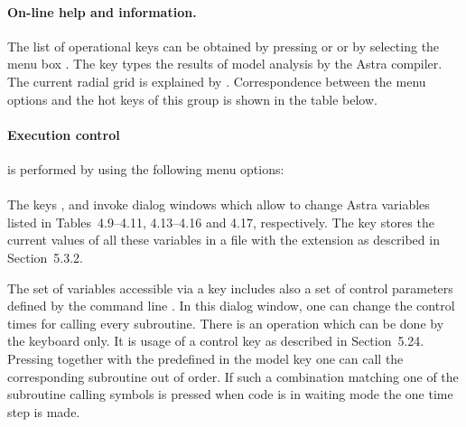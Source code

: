 \paragraph{On-line help and information.}
The list of operational keys can be obtained by pressing  or
 or by selecting the menu box . 
The key  types the results of model analysis by the Astra
compiler. 
The current radial grid is explained by .
Correspondence between the menu options and the hot keys of this group
is shown in the table below.
\bigskip\\ 

\paragraph{Execution control} is performed by using the following menu
options: 
\bigskip\\ 
\\[2ex]
The keys ,  and  invoke dialog windows which 
allow to change Astra variables listed in Tables~4.9--4.11, 4.13--4.16
and 4.17, respectively.
The key  stores the current values of all these variables in a
file with the extension  as described in Section~5.3.2.

The set of variables accessible via a key  includes 
also a set of control parameters defined by the command line .
In this dialog window, one can change the control times for calling every
subroutine. 
There is an operation which can be done by the keyboard only.
It is usage of a control key as described in Section~5.24.
Pressing  together with the predefined in the model key one
can call the corresponding subroutine out of order.
If such a combination matching one of the subroutine calling symbols is
pressed when code is in waiting mode the one time step is made.

